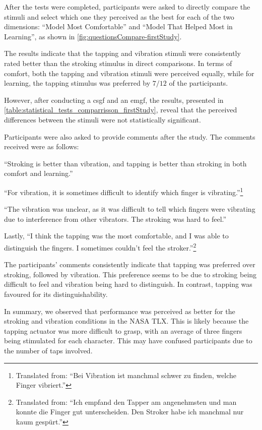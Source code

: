 After the tests were completed, participants were asked to directly compare the stimuli and select which one they perceived as the best for each of the two dimensions: \enquote{Model Most Comfortable} and \enquote{Model That Helped Most in Learning}, as shown in \autoref{fig:questionsCompare-firstStudy}. 

The results indicate that the tapping and vibration stimuli were consistently rated better than the stroking stimulus in direct comparisons. In terms of comfort, both the tapping and vibration stimuli were perceived equally, while for learning, the tapping stimulus was preferred by $7/12$ of the participants. 

However, after conducting a \gls{csgf} and an \gls{emgf}, the results, presented in \autoref{table:statistical_tests_comparrisson_firstStudy}, reveal that the perceived differences between the stimuli were not statistically significant.

Participants were also asked to provide comments after the study. The comments received were as follows:

\enquote{Stroking is better than vibration, and tapping is better than stroking in both comfort and learning.}

\enquote{For vibration, it is sometimes difficult to identify which finger is vibrating.}\footnote{Translated from: \enquote{Bei Vibration ist manchmal schwer zu finden, welche Finger vibriert.}}

\enquote{The vibration was unclear, as it was difficult to tell which fingers were vibrating due to interference from other vibrators. The stroking was hard to feel.}

Lastly, \enquote{I think the tapping was the most comfortable, and I was able to distinguish the fingers. I sometimes couldn’t feel the stroker.}\footnote{Translated from: \enquote{Ich empfand den Tapper am angenehmsten und man konnte die Finger gut unterscheiden. Den Stroker habe ich manchmal nur kaum gespürt.}}

The participants' comments consistently indicate that tapping was preferred over stroking, followed by vibration. This preference seems to be due to stroking being difficult to feel and vibration being hard to distinguish. In contrast, tapping was favoured for its distinguishability.

In summary, we observed that performance was perceived as better for the stroking and vibration conditions in the NASA TLX. This is likely because the tapping actuator was more difficult to grasp, with an average of three fingers being stimulated for each character. This may have confused participants due to the number of taps involved.


